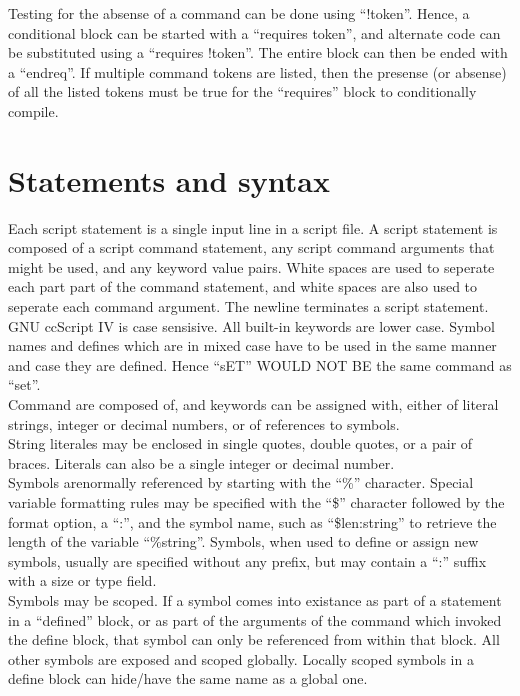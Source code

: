 \documentclass[a4paper,12pt]{article}
\begin{document}
Testing for the absense of a command can be done using ``!token''.  Hence,
a conditional block can be started with a ``requires token'', and alternate
code can be substituted using a ``requires !token''.  The entire block can
then be ended with a ``endreq''.  If multiple command tokens are listed, then
the presense (or absense) of all the listed tokens must be true for the
``requires'' block to conditionally compile. \\ 

\section{Statements and syntax}

Each script statement is a single input line in a script file.  A script
statement is composed of a script command statement, any script command
arguments that might be used, and any keyword value pairs.  White spaces are
used to seperate each part part of the command statement, and white spaces are
also used to seperate each command argument.  The newline terminates a
script statement. \\

GNU ccScript IV is case sensisive.  All built-in keywords are lower case.
Symbol names and defines which are in mixed case have to be used in the same
manner and case they are defined.  Hence ``sET'' WOULD NOT BE the same command
as ``set''. \\

Command  are composed of, and keywords can be assigned with, either of literal
strings, integer or decimal numbers, or of references to symbols. \\

String literales may be enclosed in single quotes, double quotes, or a pair of
{} braces.   Literals can also be a single integer or decimal number. \\

Symbols arenormally referenced by starting with the ``\%'' character.  Special variable
formatting rules may be specified with the ``\$'' character followed by the
format option, a ``:'', and the symbol name, such as ``\$len:string'' to
retrieve the length of the variable ``\%string''.  Symbols, when used to
define or assign new symbols, usually are specified without any prefix, but
may contain a ``:'' suffix with a size or type field. \\

Symbols may be scoped.  If a symbol comes into existance as part of a statement
in a ``defined'' block, or as part of the arguments of the command which
invoked the define block, that symbol can only be referenced from within that
block.  All other symbols are exposed and scoped globally.  Locally scoped
symbols in a define block can hide/have the same name as a global one. \\
\end{document}
